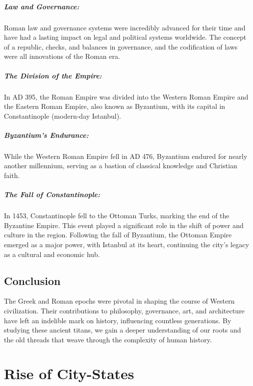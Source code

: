 \documentclass{book}
\begin{document}
\paragraph{Law and Governance:}
Roman law and governance systems were incredibly advanced for their time and have had a lasting impact on legal and political systems worldwide. The concept of a republic, checks, and balances in governance, and the codification of laws were all innovations of the Roman era.

\paragraph{The Division of the Empire:}
In AD 395, the Roman Empire was divided into the Western Roman Empire and the Eastern Roman Empire, also known as Byzantium, with its capital in Constantinople (modern-day Istanbul).

\paragraph{Byzantium’s Endurance:}
While the Western Roman Empire fell in AD 476, Byzantium endured for nearly another millennium, serving as a bastion of classical knowledge and Christian faith.

\paragraph{The Fall of Constantinople:}
In 1453, Constantinople fell to the Ottoman Turks, marking the end of the Byzantine Empire. This event played a significant role in the shift of power and culture in the region. Following the fall of Byzantium, the Ottoman Empire emerged as a major power, with Istanbul at its heart, continuing the city’s legacy as a cultural and economic hub.

\section*{Conclusion}

The Greek and Roman epochs were pivotal in shaping the course of Western civilization. Their contributions to philosophy, governance, art, and architecture have left an indelible mark on history, influencing countless generations. By studying these ancient titans, we gain a deeper understanding of our roots and the old threads that weave through the complexity of human history.

\chapter{Rise of City-States}
\end{document}
